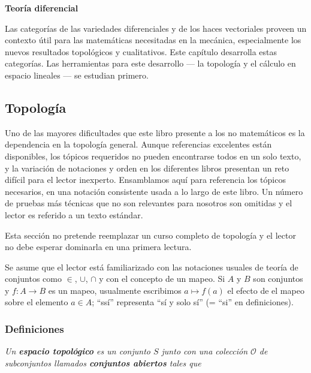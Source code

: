 \documentclass[a4paper,10pt]{article}
\numberwithin{equation}{section}
\begin{document}
\vspace{.3cm}

{\Large \textbf{Teoría diferencial}}

\vspace{4cm}

Las categorías de las variedades diferenciales y de los haces vectoriales proveen un 
contexto útil para las matemáticas necesitadas en la mecánica, especialmente los 
nuevos resultados topológicos y cualitativos. Este capítulo desarrolla estas categorías.
Las herramientas para este desarrollo --- la topología y el cálculo en espacio lineales ---
se estudian primero.

\subsection{Topología}

Uno de las mayores dificultades que este libro presente a los no matemáticos es la 
dependencia en la topología general. Aunque referencias excelentes están disponibles, 
los tópicos requeridos no pueden encontrarse todos en un solo texto, y la variación 
de notaciones y orden en los diferentes libros presentan un reto difícil para el 
lector inexperto. Ensamblamos aquí para referencia los tópicos necesarios, en una 
notación consistente usada a lo largo de este libro. Un número de pruebas más 
técnicas que no son relevantes para nosotros son omitidas y el lector es referido 
a un texto estándar. 

\vspace{.3cm}

Esta sección no pretende reemplazar un curso completo de topología y el lector no debe 
esperar dominarla en una primera lectura.

\vspace{.3cm}

Se asume que el lector está familiarizado con las notaciones usuales de teoría de 
conjuntos como $\in$, $\cup$, $\cap$ y con el concepto de un mapeo. Si 
$A$ y $B$ son conjuntos y $f:A \rightarrow B$ es un mapeo, usualmente 
escribimos $a \mapsto f(a)$ el efecto de el mapeo sobre el elemento 
$a \in A$; ``ssí'' representa ``sí y solo sí'' (= ``si'' en definiciones).

\subsubsection{Definiciones} \emph{Un \textbf{espacio topológico} es un 
conjunto $S$ junto con una colección $\mathcal{O}$ de subconjuntos llamados 
\textbf{conjuntos abiertos} tales que}
\end{document}
